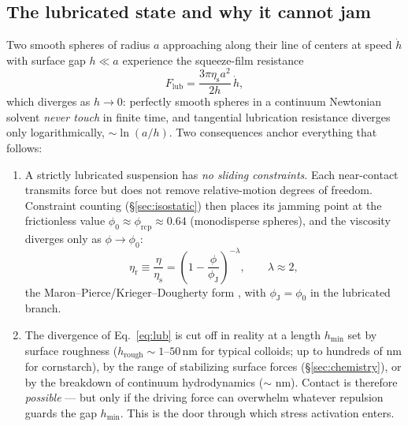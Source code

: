 \documentclass[11pt]{article}
\newcommand{\phiJ}{\phi_{\mathrm{J}}}
\newcommand{\phiO}{\phi_{0}}
\newcommand{\phiRCP}{\phi_{\mathrm{rcp}}}
\newcommand{\etar}{\eta_{\mathrm{r}}}
\newcommand{\etas}{\eta_{\mathrm{s}}}
\begin{document}
\subsection{The lubricated state and why it cannot jam}
\label{sec:lubrication}
Two smooth spheres of radius $a$ approaching along their line of centers at speed $\dot h$ with surface gap $h \ll a$ experience the squeeze-film resistance
\begin{equation}
F_{\mathrm{lub}} = \frac{3\pi \etas a^2}{2h}\,\dot h ,
\label{eq:lub}
\end{equation}
which diverges as $h \to 0$: perfectly smooth spheres in a continuum Newtonian solvent \emph{never touch} in finite time, and tangential lubrication resistance diverges only logarithmically, $\sim \ln(a/h)$. Two consequences anchor everything that follows:

\begin{enumerate}
\item A strictly lubricated suspension has \emph{no sliding constraints}. Each near-contact transmits force but does not remove relative-motion degrees of freedom. Constraint counting (\S\ref{sec:isostatic}) then places its jamming point at the frictionless value $\phiO \approx \phiRCP \approx 0.64$ (monodisperse spheres), and the viscosity diverges only as $\phi \to \phiO$:
\begin{equation}
\etar \equiv \frac{\eta}{\etas} = \left(1 - \frac{\phi}{\phiJ}\right)^{-\lambda}, \qquad \lambda \approx 2,
\label{eq:maronpierce}
\end{equation}
the Maron--Pierce/Krieger--Dougherty form \cite{krieger1959,guazzelli2018}, with $\phiJ = \phiO$ in the lubricated branch.
\item The divergence of Eq.~\eqref{eq:lub} is cut off in reality at a length $h_{\min}$ set by surface roughness ($h_{\mathrm{rough}} \sim 1$--$50\,\mathrm{nm}$ for typical colloids; up to hundreds of nm for cornstarch), by the range of stabilizing surface forces (\S\ref{sec:chemistry}), or by the breakdown of continuum hydrodynamics ($\sim$ nm). Contact is therefore \emph{possible} --- but only if the driving force can overwhelm whatever repulsion guards the gap $h_{\min}$. This is the door through which stress activation enters.
\end{enumerate}
\end{document}
